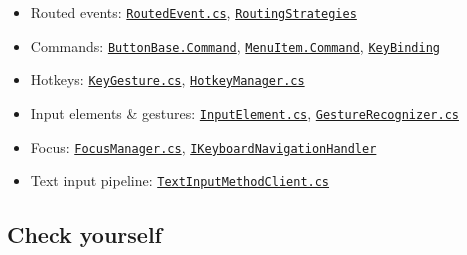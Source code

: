 \begin{itemize}
\tightlist
\item
  Routed events:
  \href{https://github.com/AvaloniaUI/Avalonia/blob/master/src/Avalonia.Interactivity/RoutedEvent.cs}{\passthrough{\lstinline!RoutedEvent.cs!}},
  \href{https://github.com/AvaloniaUI/Avalonia/blob/master/src/Avalonia.Interactivity/RoutingStrategies.cs}{\passthrough{\lstinline!RoutingStrategies!}}
\item
  Commands:
  \href{https://github.com/AvaloniaUI/Avalonia/blob/master/src/Avalonia.Controls/Primitives/ButtonBase.cs}{\passthrough{\lstinline!ButtonBase.Command!}},
  \href{https://github.com/AvaloniaUI/Avalonia/blob/master/src/Avalonia.Controls/MenuItem.cs}{\passthrough{\lstinline!MenuItem.Command!}},
  \href{https://github.com/AvaloniaUI/Avalonia/blob/master/src/Avalonia.Input/KeyBinding.cs}{\passthrough{\lstinline!KeyBinding!}}
\item
  Hotkeys:
  \href{https://github.com/AvaloniaUI/Avalonia/blob/master/src/Avalonia.Base/Input/KeyGesture.cs}{\passthrough{\lstinline!KeyGesture.cs!}},
  \href{https://github.com/AvaloniaUI/Avalonia/blob/master/src/Avalonia.Controls/HotkeyManager.cs}{\passthrough{\lstinline!HotkeyManager.cs!}}
\item
  Input elements \& gestures:
  \href{https://github.com/AvaloniaUI/Avalonia/blob/master/src/Avalonia.Base/Input/InputElement.cs}{\passthrough{\lstinline!InputElement.cs!}},
  \href{https://github.com/AvaloniaUI/Avalonia/blob/master/src/Avalonia.Base/Input/GestureRecognizers/GestureRecognizer.cs}{\passthrough{\lstinline!GestureRecognizer.cs!}}
\item
  Focus:
  \href{https://github.com/AvaloniaUI/Avalonia/blob/master/src/Avalonia.Base/Input/FocusManager.cs}{\passthrough{\lstinline!FocusManager.cs!}},
  \href{https://github.com/AvaloniaUI/Avalonia/blob/master/src/Avalonia.Base/Input/IKeyboardNavigationHandler.cs}{\passthrough{\lstinline!IKeyboardNavigationHandler!}}
\item
  Text input pipeline:
  \href{https://github.com/AvaloniaUI/Avalonia/blob/master/src/Avalonia.Base/Input/TextInput/TextInputMethodClient.cs}{\passthrough{\lstinline!TextInputMethodClient.cs!}}
\end{itemize}

\subsection{Check yourself}\label{check-yourself-7}

